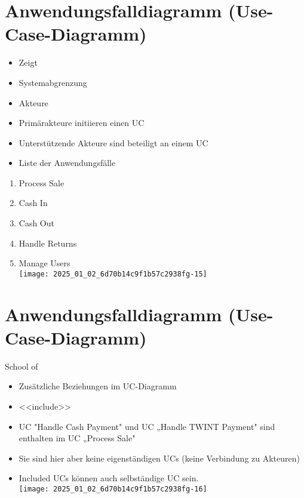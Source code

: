 \documentclass[10pt]{article}
\begin{document}
\section*{Anwendungsfalldiagramm (Use-Case-Diagramm)}
\begin{itemize}
  \item Zeigt
  \item Systemabgrenzung
  \item Akteure
  \item Primärakteure initiieren einen UC
  \item Unterstützende Akteure sind beteiligt an einem UC
  \item Liste der Anwendungsfälle
\end{itemize}

\begin{enumerate}
  \item Process Sale
  \item Cash In
  \item Cash Out
  \item Handle Returns
  \item Manage Users\\
\texttt{[image: 2025\_01\_02\_6d70b14c9f1b57c2938fg-15]}
\end{enumerate}

\section*{Anwendungsfalldiagramm (Use-Case-Diagramm)}
School of

\begin{itemize}
  \item Zusätzliche Beziehungen im UC-Diagramm
  \item <<include>>
  \item UC "Handle Cash Payment" und UC „Handle TWINT Payment" sind enthalten im UC „Process Sale"
  \item Sie sind hier aber keine eigenständigen UCs (keine Verbindung zu Akteuren)
  \item Included UCs können auch selbständige UC sein.\\
\texttt{[image: 2025\_01\_02\_6d70b14c9f1b57c2938fg-16]}
\end{itemize}
\end{document}
